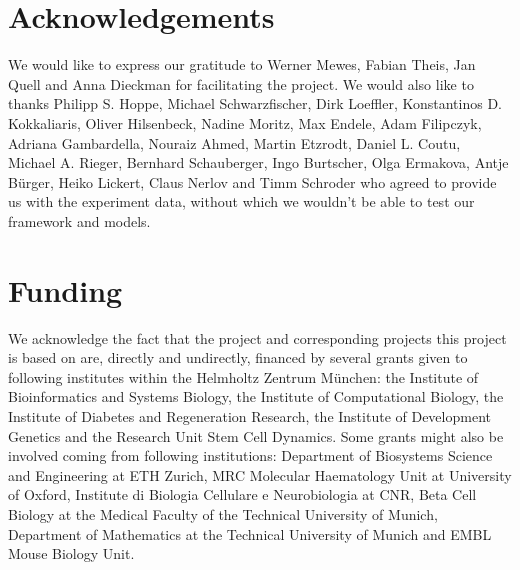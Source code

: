 \documentclass{bioinfo}
\begin{document}


\section*{Acknowledgements}

We would like to express our gratitude to Werner Mewes, Fabian Theis, Jan Quell and Anna Dieckman for facilitating the project. We would also like to thanks Philipp S. Hoppe, Michael Schwarzfischer, Dirk Loeffler, Konstantinos D. Kokkaliaris, Oliver Hilsenbeck, Nadine Moritz, Max Endele, Adam Filipczyk, Adriana Gambardella, Nouraiz Ahmed, Martin Etzrodt, Daniel L. Coutu, Michael A. Rieger, Bernhard Schauberger, Ingo Burtscher, Olga Ermakova, Antje B\"urger, Heiko Lickert, Claus Nerlov and Timm Schroder who agreed to provide us with the experiment data, without which we wouldn't be able to test our framework and models.

\vspace*{-18pt}

\section*{Funding}

We acknowledge the fact that the project and corresponding projects this project is based on are, directly and undirectly, financed by several grants given to following institutes within the Helmholtz Zentrum M\"unchen: the Institute of Bioinformatics and Systems Biology, the Institute of Computational Biology, the Institute of Diabetes and Regeneration Research, the Institute of Development Genetics and the Research Unit Stem Cell Dynamics. Some grants might also be involved coming from following institutions: Department of Biosystems Science and Engineering at ETH Zurich, MRC Molecular Haematology Unit at University of Oxford, Institute di Biologia Cellulare e Neurobiologia at CNR, Beta Cell Biology at the Medical Faculty of the Technical University of Munich, Department of Mathematics at the Technical University of Munich and EMBL Mouse Biology Unit.\vspace*{-12pt}

%
%
%
%
%
%
%
%
%
\end{document}
